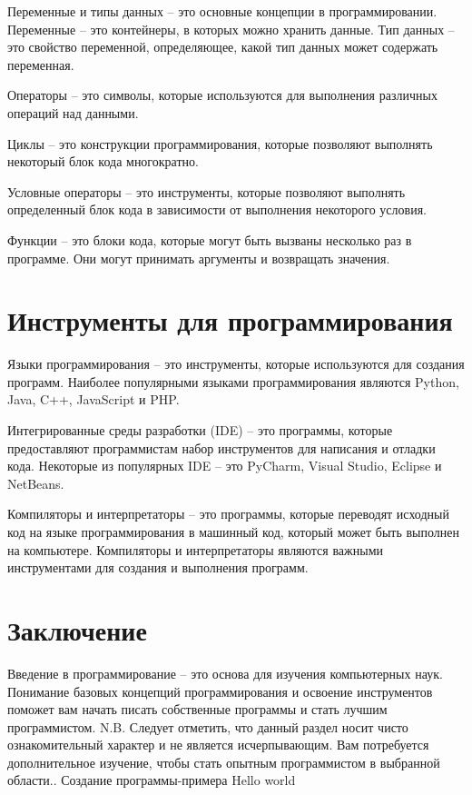\documentclass[draft]{article}
\begin{document}
Переменные и типы данных – это основные концепции в программировании. Переменные – это контейнеры, в которых можно хранить данные. Тип данных – это свойство переменной, определяющее, какой тип данных может содержать переменная.

Операторы – это символы, которые используются для выполнения различных операций над данными.

Циклы – это конструкции программирования, которые позволяют выполнять некоторый блок кода многократно.

Условные операторы – это инструменты, которые позволяют выполнять определенный блок кода в зависимости от выполнения некоторого условия.

Функции – это блоки кода, которые могут быть вызваны несколько раз в программе. Они могут принимать аргументы и возвращать значения.

\section{Инструменты для программирования}

Языки программирования – это инструменты, которые используются для создания программ. Наиболее популярными языками программирования являются Python, Java, C++, JavaScript и PHP.

Интегрированные среды разработки (IDE) – это программы, которые предоставляют программистам набор инструментов для написания и отладки кода. Некоторые из популярных IDE – это PyCharm, Visual Studio, Eclipse и NetBeans.

Компиляторы и интерпретаторы – это программы, которые переводят исходный код на языке программирования в машинный код, который может быть выполнен на компьютере. Компиляторы и интерпретаторы являются важными инструментами для создания и выполнения программ.

\section{Заключение}

Введение в программирование – это основа для изучения компьютерных наук. Понимание базовых концепций программирования и освоение инструментов поможет вам начать писать собственные программы и стать лучшим программистом. N.B. Следует отметить, что данный раздел носит чисто ознакомительный характер и не является исчерпывающим. Вам потребуется дополнительное изучение, чтобы стать опытным программистом в выбранной области.. Создание программы-примера Hello world
\end{document}

